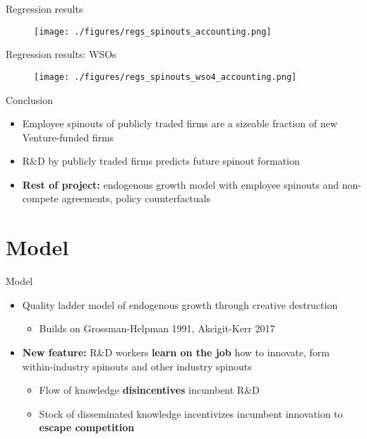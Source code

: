 \documentclass[english,usenames,dvipsnames]{beamer}
\begin{document}
\begin{frame}{Regression results}
\begin{figure}
\texttt{[image: ./figures/regs\_spinouts\_accounting.png]}
\end{figure}
\end{frame}

\begin{frame}{Regression results: WSOs}
\begin{figure}
\texttt{[image: ./figures/regs\_spinouts\_wso4\_accounting.png]}
\end{figure}
\end{frame}


\begin{frame}{Conclusion}
\begin{itemize}
\item Employee spinouts of publicly traded firms are a sizeable fraction of new Venture-funded firms
\item R\&D by publicly traded firms predicts future spinout formation 
\item \textbf{Rest of project: } endogenous growth model with employee spinouts and non-compete agreements, policy counterfactuals
\end{itemize}
\end{frame}


\section{Model}

\begin{frame}
\tableofcontents[currentsection]
\end{frame}

\begin{frame}{Model}
\begin{itemize}	
	\item Quality ladder model of endogenous growth through creative destruction 
	\begin{itemize}
		\item Builds on Grossman-Helpman 1991, Akcigit-Kerr 2017 
	\end{itemize}
	\item \textbf{New feature:} R\&D workers \textbf{\alert{learn on the job}} how to innovate, form within-industry spinouts and other industry spinouts
	\begin{itemize}
		\item Flow of knowledge \textbf{\alert{disincentives}} incumbent R\&D
		\item Stock of disseminated knowledge incentivizes incumbent innovation to \textbf{\alert{escape competition}}
	\end{itemize} 
\end{itemize}
\end{frame}
\end{document}
